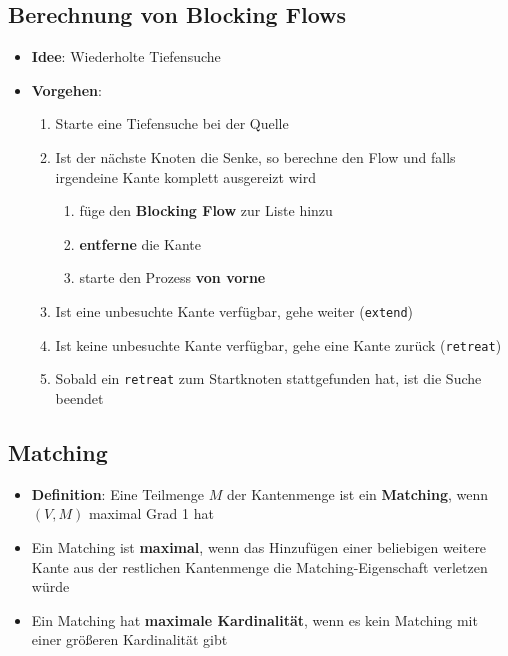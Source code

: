 \subsection{Berechnung von Blocking Flows}%
\label{mfm:sub:berechnung_von_blocking_flows}

\begin{itemize}
	\item \textbf{Idee}: Wiederholte Tiefensuche
	\item \textbf{Vorgehen}:
	\begin{enumerate}
		\item Starte eine Tiefensuche bei der Quelle
		\item Ist der nächste Knoten die Senke, so berechne den Flow und falls irgendeine Kante komplett ausgereizt wird
		\begin{enumerate}
			\item füge den \textbf{Blocking Flow} zur Liste hinzu
			\item \textbf{entferne} die Kante
			\item starte den Prozess \textbf{von vorne}
		\end{enumerate}
		\item Ist eine unbesuchte Kante verfügbar, gehe weiter (\texttt{extend})
		\item Ist keine unbesuchte Kante verfügbar, gehe eine Kante zurück (\texttt{retreat})
		\item Sobald ein \texttt{retreat} zum Startknoten stattgefunden hat, ist die Suche beendet
	\end{enumerate}
\end{itemize}

\subsection{Matching}%
\label{mfm:sub:matching}

\begin{itemize}
	\item \textbf{Definition}: Eine Teilmenge $M$ der Kantenmenge ist ein \textbf{Matching}, wenn $(V, M)$ maximal Grad 1 hat
	\item Ein Matching ist \textbf{maximal}, wenn das Hinzufügen einer beliebigen weitere Kante aus der restlichen Kantenmenge die Matching-Eigenschaft verletzen würde
	\item Ein Matching hat \textbf{maximale Kardinalität}, wenn es kein Matching mit einer größeren Kardinalität gibt
\end{itemize}

